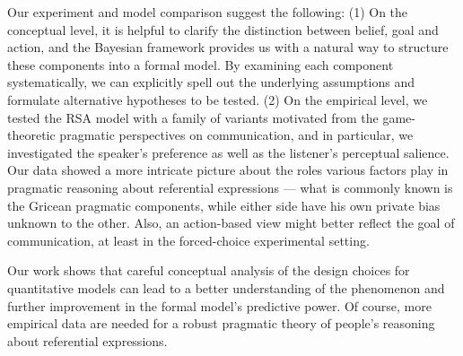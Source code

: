 Our experiment and model comparison suggest the following: (1) On the conceptual level, 
it is helpful to clarify the distinction between belief, goal and action, and the Bayesian framework provides us with a natural way to structure these components into a formal model. By examining each component systematically, we can explicitly spell out the underlying assumptions and formulate alternative hypotheses to be tested. (2) On the empirical level, we tested the RSA model with a family of variants motivated from the game-theoretic pragmatic perspectives on communication, and in particular, we investigated the speaker's preference as well as the listener's perceptual salience. Our data showed a more intricate picture about the roles various factors play in pragmatic reasoning about referential expressions --- what is commonly known is the Gricean pragmatic components, while either side have his own private bias unknown to the other. Also, an action-based view might better reflect the goal of communication, at least in the forced-choice experimental setting.

Our work shows that careful conceptual analysis of the design choices for quantitative models can lead to a better understanding of the phenomenon and further improvement in the formal model's predictive power. Of course, more empirical data are needed for a robust pragmatic theory of people's reasoning about referential expressions. 

